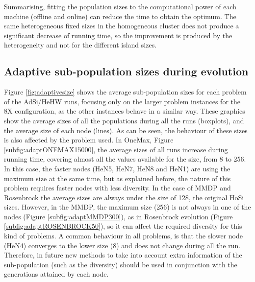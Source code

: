 \documentclass[final,1p,times]{elsarticle}
\begin{document}
 





Summarising, fitting the population sizes to the
  computational power of each machine (offline and online) can reduce
  the time to obtain the optimum. The same heterogeneous fixed sizes
  in the homogeneous cluster does not produce a significant decrease
  of running time, so the improvement is produced by the heterogeneity
  and not for the different island sizes. 

\subsection{Adaptive sub-population sizes during evolution}

Figure \ref{fig:adaptivesize} shows the average sub-population sizes for each problem of the AdSi/HeHW runs, focusing only on the larger problem instances for the 8X configuration, as the other instances behave in a similar way. These graphics show the average sizes of all the populations during all the runs (boxplots), and the average size of each node (lines). As can be seen, the behaviour of these sizes is also affected by the problem used. In OneMax, Figure \ref{subfig:adaptONEMAX15000}, the average sizes of all runs increase during running time, covering almost all the values available for the size, from 8 to 256.  In this case, the faster nodes (HeN5, HeN7, HeN8 and HeN1) are using the maximum size at the same time, but as explained before, the nature of this problem requires faster nodes with less diversity. In the case of MMDP and Rosenbrock the average sizes are always under the size of 128, the original HoSi sizes. However, in the MMDP, the maximum size (256) is not always in one of the nodes (Figure \ref{subfig:adaptMMDP300}), as in Rosenbrock evolution (Figure \ref{subfig:adaptROSENBROCK50}), so it can affect the required diversity for this kind of problems. A common behaviour in all problems, is that the slower node (HeN4) converges to the lower size (8) and does not change during all the run. Therefore, in future new methods to take into account extra information of the sub-population (such as the diversity) should be used in conjunction with the generations attained by each node.
\end{document}

